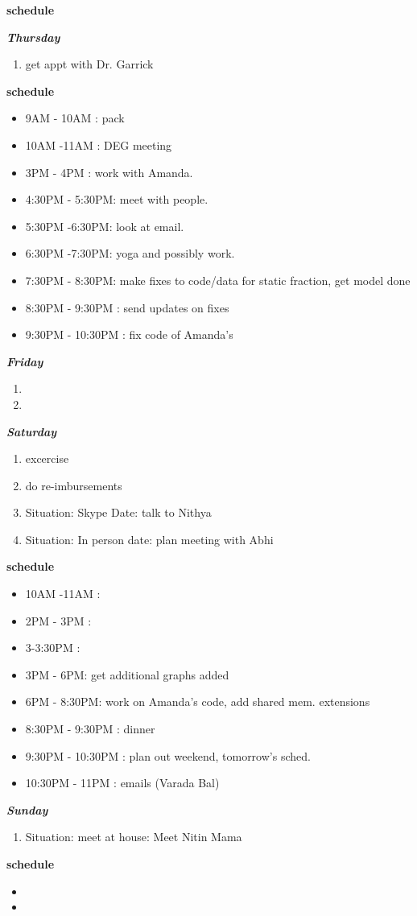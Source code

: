 \documentclass[11pt]{article}
\begin{document}
\textbf{schedule}
\begin{itemize}

\end{itemize}

\textbf{\textit{Thursday}}
\begin{enumerate}
\item  get appt with Dr. Garrick
\end{enumerate}

\textbf{schedule}
\begin{itemize}
\item 9AM - 10AM :  pack
\item 10AM -11AM : DEG meeting
\item 3PM - 4PM : work with Amanda.
\item 4:30PM - 5:30PM: meet with people.
\item 5:30PM -6:30PM:  look at email.
\item 6:30PM -7:30PM:  yoga and possibly work.
\item 7:30PM - 8:30PM: make fixes to code/data for static fraction, get model done
\item 8:30PM - 9:30PM : send updates on fixes
\item 9:30PM - 10:30PM : fix code of Amanda's
\end{itemize}


\textbf{\textit{Friday}}
\begin{enumerate}
\item
\item
\end{enumerate}

\textbf{\textit{Saturday}}
\begin{enumerate}
\item excercise
\item do re-imbursements
\item Situation: Skype Date: talk to Nithya
\item Situation: In person date: plan meeting with Abhi

\end{enumerate}
\newpage
\textbf{schedule}
\begin{itemize}
\item 10AM -11AM :
\item 2PM - 3PM :
\item 3-3:30PM :
\item 3PM - 6PM: get additional graphs added
\item 6PM - 8:30PM: work on Amanda's code, add shared mem. extensions
\item 8:30PM - 9:30PM : dinner
\item 9:30PM - 10:30PM : plan out weekend, tomorrow's sched.
\item 10:30PM - 11PM : emails (Varada Bal)
\end{itemize}


\textbf{\textit{Sunday}}
\begin{enumerate}

\item Situation: meet at house: Meet Nitin Mama

\end{enumerate}

\textbf{schedule}
\begin{itemize}
\item
\item
\end{itemize}
\end{document}
